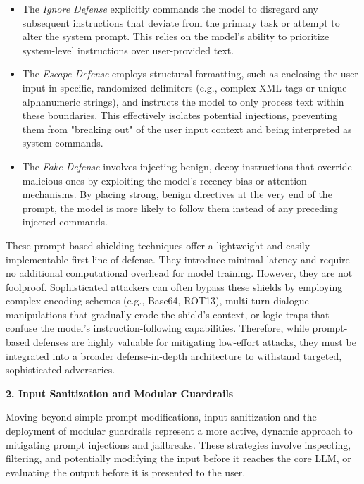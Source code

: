 \documentclass[11pt,a4paper]{article}
\begin{document}
\begin{itemize}
  \item The \textit{Ignore Defense} explicitly commands the model to disregard any subsequent instructions that deviate from the primary task or attempt to alter the system prompt. This relies on the model's ability to prioritize system-level instructions over user-provided text.
  \item The \textit{Escape Defense} employs structural formatting, such as enclosing the user input in specific, randomized delimiters (e.g., complex XML tags or unique alphanumeric strings), and instructs the model to only process text within these boundaries. This effectively isolates potential injections, preventing them from "breaking out" of the user input context and being interpreted as system commands.
  \item The \textit{Fake Defense} involves injecting benign, decoy instructions that override malicious ones by exploiting the model's recency bias or attention mechanisms. By placing strong, benign directives at the very end of the prompt, the model is more likely to follow them instead of any preceding injected commands.
\end{itemize}
These prompt-based shielding techniques offer a lightweight and easily implementable first line of defense. They introduce minimal latency and require no additional computational overhead for model training. However, they are not foolproof. Sophisticated attackers can often bypass these shields by employing complex encoding schemes (e.g., Base64, ROT13), multi-turn dialogue manipulations that gradually erode the shield's context, or logic traps that confuse the model's instruction-following capabilities. Therefore, while prompt-based defenses are highly valuable for mitigating low-effort attacks, they must be integrated into a broader defense-in-depth architecture to withstand targeted, sophisticated adversaries.

\textbf{2. Input Sanitization and Modular Guardrails}

Moving beyond simple prompt modifications, input sanitization and the deployment of modular guardrails represent a more active, dynamic approach to mitigating prompt injections and jailbreaks. These strategies involve inspecting, filtering, and potentially modifying the input before it reaches the core LLM, or evaluating the output before it is presented to the user.
\end{document}
